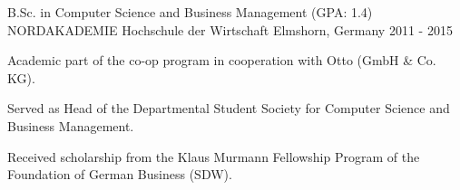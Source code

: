 \begin{cventries}
  \cventry
    {B.Sc. in Computer Science and Business Management (GPA: 1.4)} %
    {NORDAKADEMIE Hochschule der Wirtschaft} %
    {Elmshorn, Germany} %
    {2011 - 2015} %
    {
      \begin{cvitems} %
        \item{Academic part of the co-op program in cooperation with Otto (GmbH \& Co. KG).}
        \item{Served as Head of the Departmental Student Society for Computer Science and Business Management.}
        \item{Received scholarship from the Klaus Murmann Fellowship Program of the Foundation of German Business (SDW).}
      \end{cvitems}
    }

\end{cventries}
